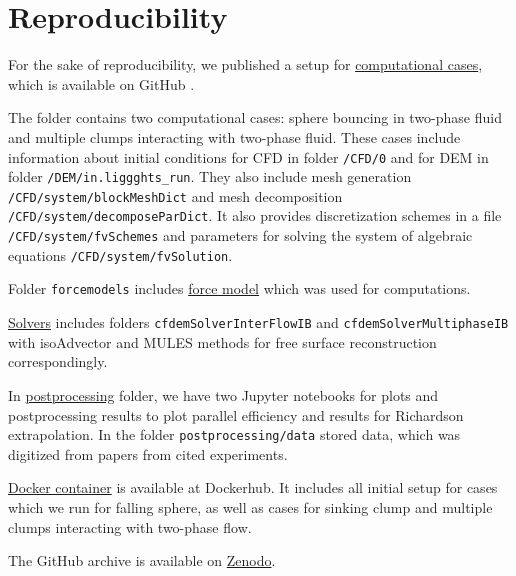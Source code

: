 \appendix
\doublespacing
\chapter{Reproducibility}
For the sake of reproducibility, we published a setup for \href{https://github.com/asarmakeeva/multiphaseIB/tree/master/reproPack/code/cases}{computational cases}, which is available on GitHub \cite{github}. 

The folder contains two computational cases: sphere bouncing in two-phase fluid and multiple clumps interacting with two-phase fluid. These cases include information about initial conditions for CFD in folder \verb|/CFD/0| and for DEM in folder \verb|/DEM/in.liggghts_run|. They also include mesh generation \verb|/CFD/system/blockMeshDict| and mesh decomposition \verb|/CFD/system/decomposeParDict|. It also provides discretization schemes 
in a file \verb|/CFD/system/fvSchemes| and parameters for solving the system of algebraic equations \verb|/CFD/system/fvSolution|.

Folder \verb|forcemodels| includes \href{https://github.com/asarmakeeva/multiphaseIB/tree/master/reproPack/code/forcemodels}{force model} which was used for computations.

\href{https://github.com/asarmakeeva/multiphaseIB/tree/master/reproPack/code/solvers}{Solvers} includes folders \verb|cfdemSolverInterFlowIB| and \verb|cfdemSolverMultiphaseIB| with isoAdvector \cite{roenby2019isoadvector} and MULES \cite{MULES} methods for free surface reconstruction correspondingly.

In \href{https://github.com/asarmakeeva/multiphaseIB/tree/master/reproPack/postprocessing}{postprocessing} folder, we have two Jupyter notebooks for plots and postprocessing results to plot parallel efficiency and results for Richardson extrapolation. In the folder \verb|postprocessing/data| stored data, which was digitized from papers from cited experiments.

\href{https://hub.docker.com/repository/docker/asarmakeeva/cfdem_ib/}{Docker container} is available at Dockerhub. It includes all initial setup for cases which we run for falling sphere, as well as cases for sinking clump and multiple clumps interacting with two-phase flow.

The GitHub archive is available on \href{https://doi.org/10.5281/zenodo.10951009}{Zenodo}.
